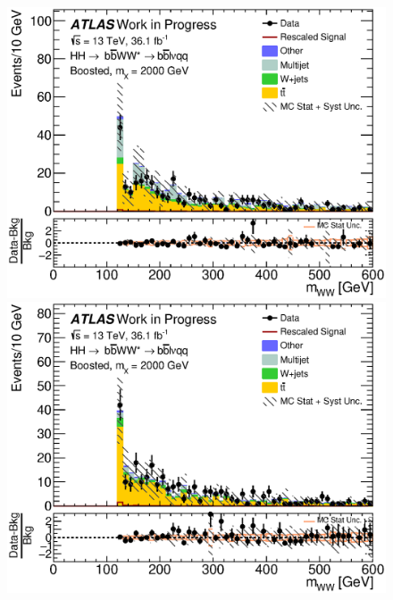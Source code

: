 \newpage
\begin{figure}[H]
\begin{center}
\includegraphics[scale=0.33]{figures/kinplots/C_2tag_mbbcr_elec_presel_met50_WWMass}
\includegraphics[scale=0.33]{figures/kinplots/C_2tag_mbbcr_muon_presel_met50_WWMass}\\

\end{center}
\end{figure}

